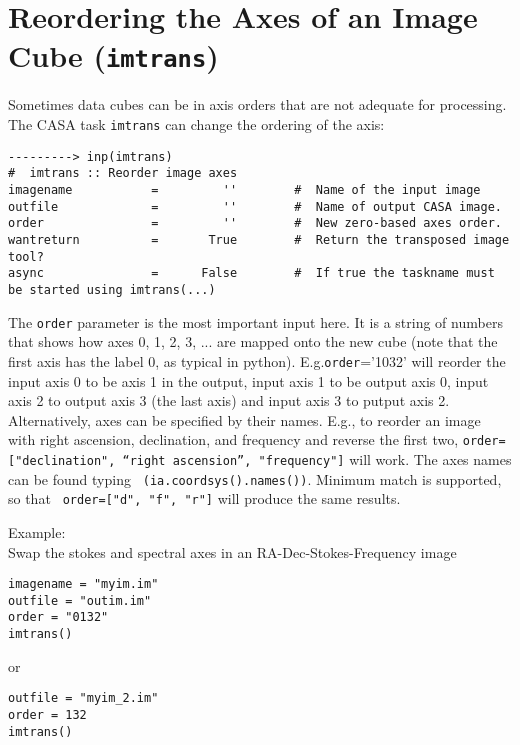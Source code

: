 \section{Reordering the Axes of an Image Cube ({\tt imtrans})}
\label{section:analysis.imtrans}

Sometimes data cubes can be in axis orders that are not adequate for
processing. The CASA task {\tt imtrans} can change the ordering of the axis:
\small
\begin{verbatim}
---------> inp(imtrans)
#  imtrans :: Reorder image axes
imagename           =         ''        #  Name of the input image
outfile             =         ''        #  Name of output CASA image.
order               =         ''        #  New zero-based axes order.
wantreturn          =       True        #  Return the transposed image tool?
async               =      False        #  If true the taskname must be started using imtrans(...)
\end{verbatim}
\normalsize




The {\tt order} parameter is the most important input here. It is a
string of numbers that shows how axes 0, 1, 2, 3, ... are mapped onto
the new cube (note that the first axis has the label 0, as typical in
python). E.g.{\tt order}='1032' will reorder the input axis 0 to be
axis 1 in the output, input axis 1 to be output axis 0, input axis 2
to output axis 3 (the last axis) and input axis 3 to putput axis
2. Alternatively, axes can be specified by their names. E.g., to reorder
an image with right ascension, declination, and frequency and reverse
the first two, {\tt order=["declination", ``right ascension'',
  "frequency"]} will work. The axes names can be found typing {\tt
  (ia.coordsys().names())}. Minimum match is supported, so that  {\tt
  order=["d", "f", "r"]} will produce the same results.

Example:\\

Swap the stokes and spectral axes in an RA-Dec-Stokes-Frequency image
\small
\begin{verbatim}
imagename = "myim.im"
outfile = "outim.im"
order = "0132"
imtrans()
\end{verbatim}

or
\begin{verbatim}
outfile = "myim_2.im"
order = 132
imtrans()
\end{verbatim}

